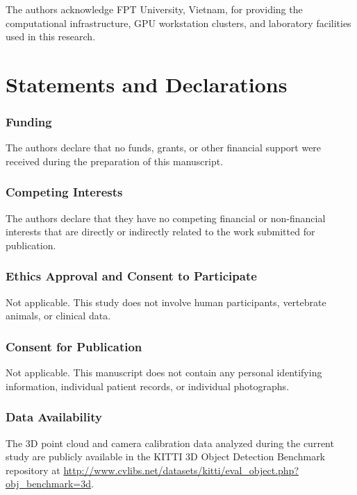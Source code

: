 
\begin{acknowledgements}
The authors acknowledge FPT University, Vietnam, for providing the computational infrastructure, GPU workstation clusters, and laboratory facilities used in this research.
\end{acknowledgements}

\section*{Statements and Declarations}

\subsubsection*{Funding}
The authors declare that no funds, grants, or other financial support were received during the preparation of this manuscript.

\subsubsection*{Competing Interests}
The authors declare that they have no competing financial or non-financial interests that are directly or indirectly related to the work submitted for publication.

\subsubsection*{Ethics Approval and Consent to Participate}
Not applicable. This study does not involve human participants, vertebrate animals, or clinical data.

\subsubsection*{Consent for Publication}
Not applicable. This manuscript does not contain any personal identifying information, individual patient records, or individual photographs.

\subsubsection*{Data Availability}
The 3D point cloud and camera calibration data analyzed during the current study are publicly available in the KITTI 3D Object Detection Benchmark repository at \url{http://www.cvlibs.net/datasets/kitti/eval_object.php?obj_benchmark=3d}.

